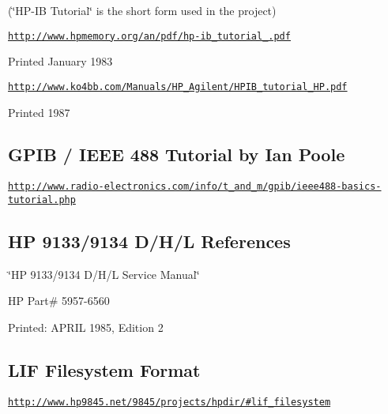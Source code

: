 \begin{DoxyItemize}
\item (\char`\"{}\-H\-P-\/\-I\-B Tutorial\char`\"{} is the short form used in the project)
\item \href{http://www.hpmemory.org/an/pdf/hp-ib_tutorial_1980.pdf}{\tt http\-://www.\-hpmemory.\-org/an/pdf/hp-\/ib\-\_\-tutorial\-\_.\-pdf}
\item Printed January 1983
\item \href{http://www.ko4bb.com/Manuals/HP_Agilent/HPIB_tutorial_HP.pdf}{\tt http\-://www.\-ko4bb.\-com/\-Manuals/\-H\-P\-\_\-\-Agilent/\-H\-P\-I\-B\-\_\-tutorial\-\_\-\-H\-P.\-pdf}
\item Printed 1987
\end{DoxyItemize}

\subsection*{G\-P\-I\-B / I\-E\-E\-E 488 Tutorial by Ian Poole}


\begin{DoxyItemize}
\item \href{http://www.radio-electronics.com/info/t_and_m/gpib/ieee488-basics-tutorial.php}{\tt http\-://www.\-radio-\/electronics.\-com/info/t\-\_\-and\-\_\-m/gpib/ieee488-\/basics-\/tutorial.\-php}
\end{DoxyItemize}

\subsection*{H\-P 9133/9134 D/\-H/\-L References}


\begin{DoxyItemize}
\item \char`\"{}\-H\-P 9133/9134 D/\-H/\-L Service Manual\char`\"{}
\item H\-P Part\# 5957-\/6560
\item Printed\-: A\-P\-R\-I\-L 1985, Edition 2
\end{DoxyItemize}

\subsection*{L\-I\-F Filesystem Format}


\begin{DoxyItemize}
\item \href{http://www.hp9845.net/9845/projects/hpdir/#lif_filesystem}{\tt http\-://www.\-hp9845.\-net/9845/projects/hpdir/\#lif\-\_\-filesystem}
\end{DoxyItemize}

